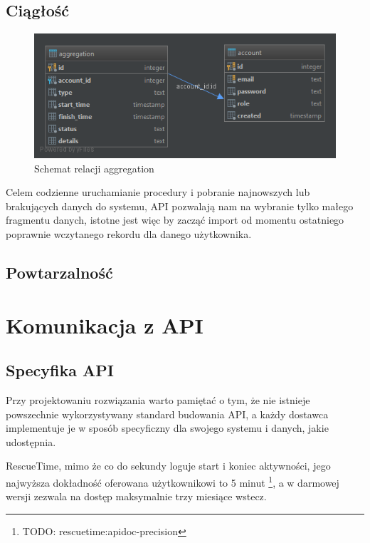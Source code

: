 \documentclass[brudnopis]{xmgr}
\begin{document}

        \subsection*{Ciągłość}

            \begin{figure}
                \includegraphics[width=\linewidth]{fig/db-aggregation.png}
                \caption{Schemat relacji aggregation}
                \label{fig:Relacja aggregation}
            \end{figure}
            Celem codzienne uruchamianie procedury i pobranie najnowszych lub brakujących danych do systemu,
            API pozwalają nam na wybranie tylko małego fragmentu danych, istotne jest więc by zacząć import
            od momentu ostatniego poprawnie wczytanego rekordu dla danego użytkownika.

        \subsection*{Powtarzalność}

    \section{Komunikacja z API}

        \subsection*{Specyfika API}
            Przy projektowaniu rozwiązania warto pamiętać o tym, że nie istnieje powszechnie wykorzystywany standard budowania API,
            a każdy dostawca implementuje je w sposób specyficzny dla swojego systemu i danych, jakie udostępnia.

            RescueTime, mimo że co do sekundy loguje start i koniec aktywności,
            jego najwyższa dokładność oferowana użytkownikowi to 5 minut \footnote{TODO: rescuetime:apidoc-precision},
            a w darmowej wersji zezwala na dostęp maksymalnie trzy miesiące wstecz.
\end{document}

